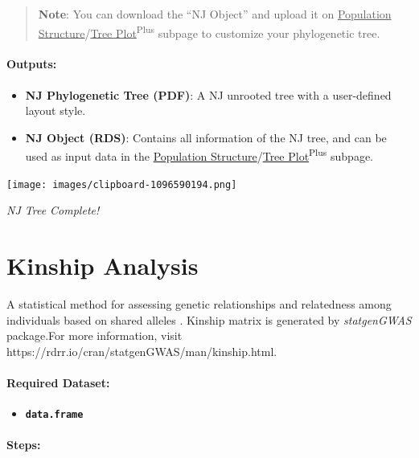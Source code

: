 \documentclass[
]{book}
\providecommand{\tightlist}{%
  \setlength{\itemsep}{0pt}\setlength{\parskip}{0pt}}
\begin{document}
\begin{quote}
\textbf{Note}: You can download the ``NJ Object'' and upload it on \ul{Population Structure}/\ul{Tree Plot}\textsuperscript{Plus} subpage to customize your phylogenetic tree.
\end{quote}

\paragraph*{Outputs:}\label{outputs-8}

\begin{itemize}
\item
  \textbf{NJ Phylogenetic Tree (PDF)}: A NJ unrooted tree with a user-defined layout style.
\item
  \textbf{NJ Object (RDS)}: Contains all information of the NJ tree, and can be used as input data in the \ul{Population Structure}/\ul{Tree Plot}\textsuperscript{Plus} subpage.
\end{itemize}

\texttt{[image: images/clipboard-1096590194.png]}

\emph{NJ Tree Complete!}

\section{Kinship Analysis}\label{kinship-analysis}

A statistical method for assessing genetic relationships and relatedness among individuals based on shared alleles \citep{kang2010}. Kinship matrix is generated by \emph{statgenGWAS} package.For more information, visit https://rdrr.io/cran/statgenGWAS/man/kinship.html.

\paragraph*{Required Dataset:}\label{required-dataset-5}

\begin{itemize}
\tightlist
\item
  {\textbf{\texttt{data.frame}}}
\end{itemize}

\paragraph*{\texorpdfstring{\textbf{Steps:}}{Steps:}}\label{steps-2}
\end{document}
